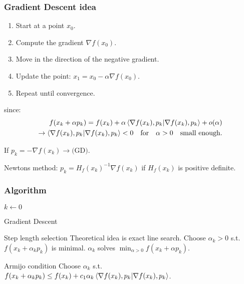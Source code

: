 \subsubsection*{Gradient Descent idea}
\begin{enumerate}
    \item Start at a point \( x_0 \).
    \item Compute the gradient \( \nabla f(x_0) \).
    \item Move in the direction of the negative gradient.
    \item Update the point: \( x_1 = x_0 - \alpha \nabla f(x_0) \).
    \item Repeat until convergence.
\end{enumerate}

since:
\begin{align*}
    f(x_k + \alpha p_k) = f(x_k) + \alpha \ip{\nabla f(x_k), p_k} + o(\alpha) \\
    \rightarrow \ip{\nabla f(x_k), p_k} < 0 \quad \text{for} \quad \alpha > 0 \quad \text{small enough}.
\end{align*}

\begin{example}{}{}
    If $p_k = - \nabla f(x_k) \rightarrow \text{(GD)}$.

    Newtons method: $p_k = H_f(x_k)^{-1} \nabla f(x_k)$ if $H_f(x_k)$ is positive definite.
\end{example}

\subsubsection*{Algorithm}
\begin{algorithm}[H]
\SetAlgoLined
{}
$k \gets 0$\;
\;
\caption{Gradient Descent}
\end{algorithm}

\begin{remark}{Step length selection}{}
    Theoretical idea is exact line search. Choose $\alpha_k > 0$ s.t. $f(x_k + \alpha_k p_k)$ is minimal.
    $\alpha_k$ solves $\min_{\alpha > 0} f(x_k + \alpha p_k)$.
\end{remark}

\begin{definition}{Armijo condition}{}
    Choose $\alpha_k$ s.t. $f(x_k + \alpha_k p_k) \leq f(x_k) + c_1 \alpha_k \ip{\nabla f(x_k), p_k}$.
\end{definition}

